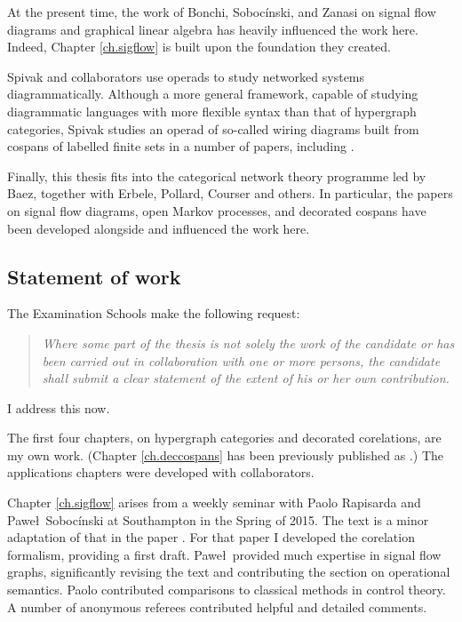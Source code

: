 
At the present time, the work of Bonchi, Soboc\'inski, and Zanasi on signal flow
diagrams and graphical linear algebra \cite{BSZ,BSZ2,BSZ3,Za} has heavily
influenced the work here. Indeed, Chapter \ref{ch.sigflow} is built upon the
foundation they created.

Spivak and collaborators use operads to study networked systems
diagrammatically. Although a more general framework, capable of studying
diagrammatic languages with more flexible syntax than that of hypergraph
categories, Spivak studies an operad of so-called wiring diagrams built from
cospans of labelled finite sets in a number of papers, including \cite{VSL,Sp,SSR}.

Finally, this thesis fits into the categorical network theory programme led by
Baez, together with Erbele, Pollard, Courser and others. In particular, the
papers \cite{BE,Erb16,BFP,Pol16,Cou16} on signal flow diagrams, open Markov
processes, and decorated cospans have been developed alongside and influenced
the work here.

\subsection*{Statement of work}

The Examination Schools make the following request:
\begin{quote}
\emph{Where some part of the thesis is not solely the work of the candidate or
has been carried out in collaboration with one or more persons, the candidate
shall submit a clear statement of the extent of his or her own contribution.}
\end{quote}
I address this now. 

The first four chapters, on hypergraph categories and decorated corelations, are
my own work. (Chapter \ref{ch.deccospans} has been previously published as
\cite{Fon15}.) The applications chapters were developed with collaborators. 

Chapter \ref{ch.sigflow} arises from a weekly seminar with Paolo Rapisarda and
Pawe\l\ Soboc\'inski at Southampton in the Spring of 2015. The text is a minor
adaptation of that in the paper \cite{FRS16}. For that paper I developed the
corelation formalism, providing a first draft. Pawe\l\ provided much expertise
in signal flow graphs, significantly revising the text and contributing the
section on operational semantics. Paolo contributed comparisons to classical
methods in control theory.  A number of anonymous referees contributed helpful
and detailed comments.

